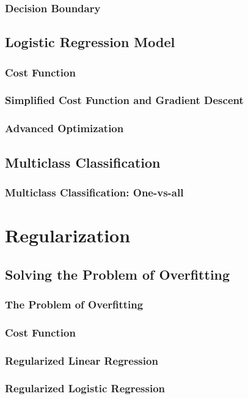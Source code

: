 \documentclass{article}
\begin{document}
\subsubsection{Decision Boundary}
\subsection{Logistic Regression Model}
\subsubsection{Cost Function}
\subsubsection{Simplified Cost Function and Gradient Descent}
\subsubsection{Advanced Optimization}
\subsection{Multiclass Classification}
\subsubsection{Multiclass Classification: One-vs-all}

\newpage

\section{Regularization}
\subsection{Solving the Problem of Overfitting}
\subsubsection{The Problem of Overfitting}
\subsubsection{Cost Function}
\subsubsection{Regularized Linear Regression}
\subsubsection{Regularized Logistic Regression}
\end{document}
